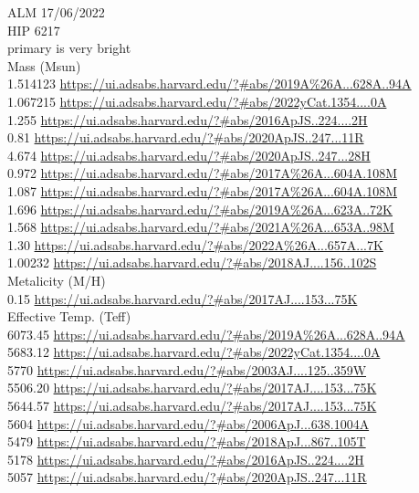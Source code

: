 ALM 17/06/2022\\
HIP 6217\\
primary is very bright\\
Mass (Msun)\\
1.514123 \url{https://ui.adsabs.harvard.edu/?#abs/2019A%26A...628A..94A}\\
1.067215 \url{https://ui.adsabs.harvard.edu/?#abs/2022yCat.1354....0A}\\
1.255 \url{https://ui.adsabs.harvard.edu/?#abs/2016ApJS..224....2H}\\
0.81 \url{https://ui.adsabs.harvard.edu/?#abs/2020ApJS..247...11R}\\
4.674 \url{https://ui.adsabs.harvard.edu/?#abs/2020ApJS..247...28H}\\
0.972 \url{https://ui.adsabs.harvard.edu/?#abs/2017A%26A...604A.108M}\\
1.087 \url{https://ui.adsabs.harvard.edu/?#abs/2017A%26A...604A.108M}\\
1.696 \url{https://ui.adsabs.harvard.edu/?#abs/2019A%26A...623A..72K}\\
1.568 \url{https://ui.adsabs.harvard.edu/?#abs/2021A%26A...653A..98M}\\
1.30 \url{https://ui.adsabs.harvard.edu/?#abs/2022A%26A...657A...7K}\\
1.00232	\url{https://ui.adsabs.harvard.edu/?#abs/2018AJ....156..102S}\\
Metalicity (M/H)\\
0.15 \url{https://ui.adsabs.harvard.edu/?#abs/2017AJ....153...75K}\\
Effective Temp. (Teff)\\
6073.45 \url{https://ui.adsabs.harvard.edu/?#abs/2019A%26A...628A..94A}\\
5683.12 \url{https://ui.adsabs.harvard.edu/?#abs/2022yCat.1354....0A}\\
5770 \url{https://ui.adsabs.harvard.edu/?#abs/2003AJ....125..359W}\\
5506.20 \url{https://ui.adsabs.harvard.edu/?#abs/2017AJ....153...75K}\\
5644.57 \url{https://ui.adsabs.harvard.edu/?#abs/2017AJ....153...75K}\\
5604 \url{https://ui.adsabs.harvard.edu/?#abs/2006ApJ...638.1004A}\\
5479 \url{https://ui.adsabs.harvard.edu/?#abs/2018ApJ...867..105T}\\
5178 \url{https://ui.adsabs.harvard.edu/?#abs/2016ApJS..224....2H}\\
5057 \url{https://ui.adsabs.harvard.edu/?#abs/2020ApJS..247...11R}\\
